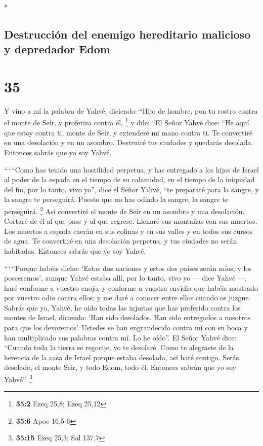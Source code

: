 \begin{paracol}{2}
\switchcolumn[0]*

\hypertarget{destrucciuxf3n-del-enemigo-hereditario-malicioso-y-depredador-edom}{%
\subsection{Destrucción del enemigo hereditario malicioso y depredador
Edom}\label{destrucciuxf3n-del-enemigo-hereditario-malicioso-y-depredador-edom}}

\hypertarget{section-68}{%
\section{35}\label{section-68}}

 Y vino a mí la palabra de Yahvé, diciendo: 
``Hijo de hombre, pon tu rostro contra el monte de Seír, y profetiza
contra él, \footnote{\textbf{35:2} Ezeq 25,8; Ezeq 25,12} 
y dile: ``El Señor Yahvé dice: ``He aquí que estoy contra ti, monte de
Seír, y extenderé mi mano contra ti. Te convertiré en una desolación y
en un asombro.  Destruiré tus ciudades y quedarás
desolada. Entonces sabrás que yo soy Yahvé.

 ``\,`\,``Como has tenido una hostilidad perpetua, y has
entregado a los hijos de Israel al poder de la espada en el tiempo de su
calamidad, en el tiempo de la iniquidad del fin,  por lo
tanto, vivo yo'', dice el Señor Yahvé, ``te prepararé para la sangre, y
la sangre te perseguirá. Puesto que no has odiado la sangre, la sangre
te perseguirá. \footnote{\textbf{35:6} Apoc 16,5-6}  Así
convertiré el monte de Seír en un asombro y una desolación. Cortaré de
él al que pase y al que regrese.  Llenaré sus montañas con
sus muertos. Los muertos a espada caerán en sus colinas y en sus valles
y en todos sus cursos de agua.  Te convertiré en una
desolación perpetua, y tus ciudades no serán habitadas. Entonces sabrás
que yo soy Yahvé.

 ``\,`\,``Porque habéis dicho: `Estas dos naciones y
estos dos países serán míos, y los poseeremos', aunque Yahvé estaba
allí,  por lo tanto, vivo yo --- dice Yahvé ---, haré
conforme a vuestro enojo, y conforme a vuestra envidia que habéis
mostrado por vuestro odio contra ellos; y me daré a conocer entre ellos
cuando os juzgue.  Sabrás que yo, Yahvé, he oído todas
las injurias que has proferido contra los montes de Israel, diciendo:
`Han sido desolados. Han sido entregados a nosotros para que los
devoremos'.  Ustedes se han engrandecido contra mí con su
boca y han multiplicado sus palabras contra mí. Lo he oído''.
 El Señor Yahvé dice: ``Cuando toda la tierra se
regocije, yo te desolaré.  Como te alegraste de la
herencia de la casa de Israel porque estaba desolada, así haré contigo.
Serás desolado, el monte Seir, y todo Edom, todo él. Entonces sabrán que
yo soy Yahvé''. \footnote{\textbf{35:15} Ezeq 25,3; Sal 137,7}


\end{paracol}
